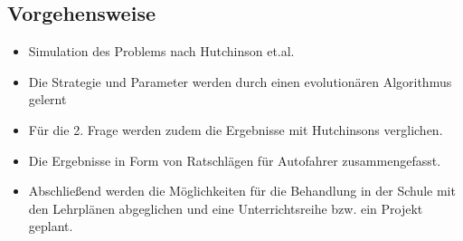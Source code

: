 \subsection{Vorgehensweise}
\begin{itemize}
	\item Simulation des Problems nach Hutchinson et.al.
	\item Die Strategie und Parameter werden durch einen evolutionären Algorithmus gelernt
	\item Für die 2. Frage werden zudem die Ergebnisse mit Hutchinsons verglichen.
	\item Die Ergebnisse in Form von Ratschlägen für Autofahrer zusammengefasst. 
	\item Abschließend werden die Möglichkeiten für die Behandlung in der Schule mit den Lehrplänen abgeglichen und eine Unterrichtsreihe bzw. ein Projekt geplant.
\end{itemize}